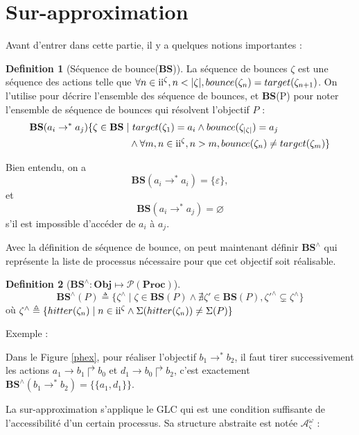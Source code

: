 \documentclass[11pt]{report}
\theoremstyle{definition}
\newtheorem{Def}{Definition}[chapter]
\newcommand{\ac}[3]{$#1\to#2\Rsh#3$}
\begin{document}
\section{Sur-approximation}
Avant d'entrer dans cette partie, il y a quelques notions importantes :  
\begin{Def}[S\'equence de bounce(\textbf{BS})]
La s\'equence de bounces $\zeta$ est une s\'equence des actions telle que $\forall n\in\text{\uppercase\expandafter{\romannumeral2}}^\zeta,n<|\zeta|,bounce(\zeta_n)=target(\zeta_{n+1})$. On l'utilise pour d\'ecrire l'ensemble des s\'equence de bounces, et \textbf{BS}(P) pour noter l'ensemble de s\'equence de bounces qui r\'esolvent l'objectif $P$ :
\begin{equation}
\begin{aligned}
\mathbf{BS}(a_i\to^*a_j)\{\zeta\in\mathbf{BS}\mid &\ target(\zeta_1)=a_i\land bounce(\zeta_{|\zeta|})=a_j\\
&\land\forall m,n\in\text{\uppercase\expandafter{\romannumeral2}}^\zeta,n>m,bounce(\zeta_n)\neq target(\zeta_m)\}
\end{aligned}
\nonumber
\end{equation}
\end{Def}
Bien entendu, on a 
$$\mathbf{BS}(a_i\to^*a_i)=\{\varepsilon\},$$
et
$$\mathbf{BS}(a_i\to^*a_j)=\varnothing$$
s'il est impossible d'acc\'eder de $a_i$ \`a $a_j$.

Avec la d\'efinition de s\'equence de bounce, on peut maintenant d\'efinir $\mathbf{BS}^\wedge$ qui repr\'esente la liste de processus n\'ecessaire pour que cet objectif soit r\'ealisable.
\begin{Def}[$\mathbf{BS}^\wedge:\mathbf{Obj}\mapsto\mathcal{P}(\mathbf{Proc})$]
$$\mathbf{BS}^\wedge(P)\triangleq\{\zeta^\wedge\mid\zeta\in\mathbf{BS}(P)\land\nexists\zeta'\in\mathbf{BS}(P),\zeta'^\wedge\subsetneq\zeta^\wedge\}$$ o\`u $\zeta^\wedge\triangleq\{hitter(\zeta_n)\mid n\in\text{\uppercase\expandafter{\romannumeral2}}^\zeta\land\Sigma(hitter(\zeta_n))\neq\Sigma(P)\}$
\end{Def}
Exemple : 

Dans le Figure \ref{phex}, pour r\'ealiser l'objectif $b_1\to^*b_2$, il faut tirer successivement les actions \ac{a_1}{b_1}{b_0} et \ac{d_1}{b_0}{b_2}, c'est exactement $\mathbf{BS}^\wedge(b_1\to^*b_2)=\{\{a_1,d_1\}\}$.

La sur-approximation s'applique le GLC qui est une condition suffisante de l'accessibilit\'e d'un certain processus. Sa structure abstraite est not\'ee $\mathcal{A}^\omega_\varsigma$ \citep{Pauleve2012} : 
\end{document}
